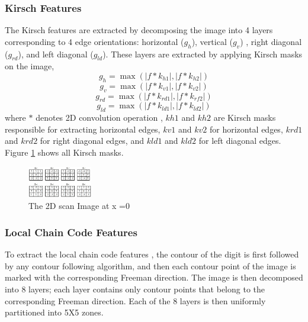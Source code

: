 \documentclass[conference]{IEEEtran}
\begin{document}
\subsubsection {Kirsch Features}
The Kirsch features \cite{Liu2003} are extracted by decomposing the image into 4 layers corresponding to 4 edge orientations: horizontal ($g_h$), vertical ($g_v$) , right diagonal ($g_{rd}$), and left diagonal ($g_{ld}$). These layers are extracted by applying Kirsch masks on the image,
\begin{equation}
 g_h=\max \left( |f*k_{h1}| , |f*k_{h2}| \right)
\label{eq:kirsh1}
\end{equation}
\begin{equation}
 g_v=\max \left( |f*k_{v1}| , |f*k_{v2}| \right)
\label{eq:kirsh1}
\end{equation}
\begin{equation}
 g_{rd}=\max \left( |f*k_{rd1}| , |f*k_{rf2}| \right)
\label{eq:kirsh1}
\end{equation}
\begin{equation}
 g_{ld}=\max \left( |f*k_{ld1}| , |f*k_{ld2}| \right)
\label{eq:kirsh1}
\end{equation}
where $*$ denotes 2D convolution operation \cite{gonzales2002}, $kh1$ and $kh2$ are Kirsch masks responsible for extracting horizontal edges, $kv1$ and $kv2$ for horizontal edges, $krd1$ and $krd2$ for right diagonal edges, and $kld1$ and $kld2$ for left diagonal edges. Figure \ref{fig:kirshMasks} shows all Kirsch masks.

  \begin{figure}
\centering
\label{fig:kirshMasks}
\includegraphics[width=0.25\textwidth]{images/kirshAll.jpg}
 \caption{The 2D scan Image at x =0 }
\end{figure}


\subsubsection {Local Chain Code Features}

To extract the local chain code features \cite{Zhang2004}, the contour of the digit is first followed by any contour following algorithm, and then each contour point of the image is marked with the corresponding Freeman direction. The image is then decomposed into 8 layers; each layer contains only contour points that belong to the corresponding Freeman direction. Each of the 8 layers is then uniformly partitioned into 5X5 zones.
\end{document}
